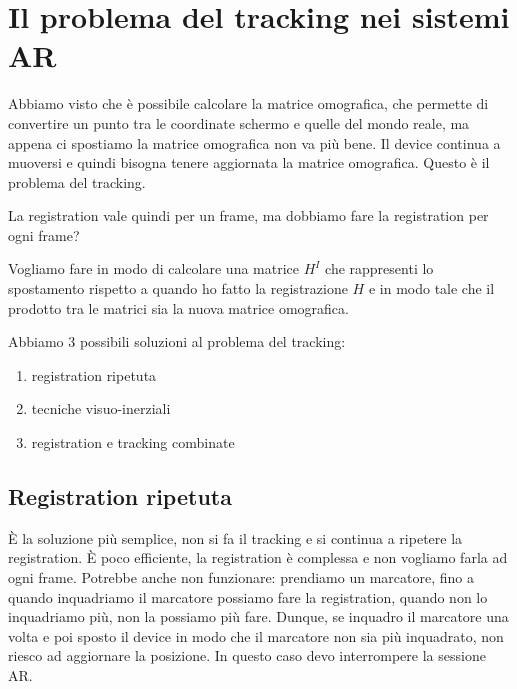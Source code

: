 \section{Il problema del tracking nei sistemi AR}
Abbiamo visto che è possibile calcolare la matrice omografica, che permette di convertire un punto tra le coordinate schermo e quelle del mondo reale, ma appena ci spostiamo la matrice omografica non va più bene. 
Il device continua a muoversi e quindi bisogna tenere aggiornata la matrice omografica. Questo è il problema del tracking.

La registration vale quindi per un frame, ma dobbiamo fare la registration per ogni frame?

Vogliamo fare in modo di calcolare una matrice $H^I$ che rappresenti lo spostamento rispetto a quando ho fatto la registrazione $H$ e in modo tale che il prodotto tra le matrici sia la nuova matrice omografica.

Abbiamo 3 possibili soluzioni al problema del tracking:
\begin{enumerate}
    \item registration ripetuta 
    \item tecniche visuo-inerziali
    \item registration e tracking combinate
\end{enumerate}

\subsection{Registration ripetuta}
È la soluzione più semplice, non si fa il tracking e si continua a ripetere la registration. 
È poco efficiente, la registration è complessa e non vogliamo farla ad ogni frame. 
Potrebbe anche non funzionare: prendiamo un marcatore, fino a quando inquadriamo il marcatore possiamo fare la registration, quando non lo inquadriamo più, non la possiamo più fare. 
Dunque, se inquadro il marcatore una volta e poi sposto il device in modo che il marcatore non sia più inquadrato, non riesco ad aggiornare la posizione. In questo caso devo interrompere la sessione AR.

